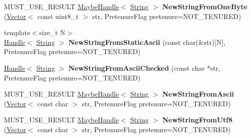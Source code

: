 \begin{DoxyCompactItemize}
\item 
\hypertarget{classv8_1_1internal_1_1_v8___f_i_n_a_l_a5a57b9c1756c5880f2775f196f86bc47}{}M\+U\+S\+T\+\_\+\+U\+S\+E\+\_\+\+R\+E\+S\+U\+L\+T \hyperlink{classv8_1_1internal_1_1_maybe_handle}{Maybe\+Handle}$<$ \hyperlink{classv8_1_1internal_1_1_string}{String} $>$ {\bfseries New\+String\+From\+One\+Byte} (\hyperlink{classv8_1_1internal_1_1_vector}{Vector}$<$ const uint8\+\_\+t $>$ str, Pretenure\+Flag pretenure=N\+O\+T\+\_\+\+T\+E\+N\+U\+R\+E\+D)\label{classv8_1_1internal_1_1_v8___f_i_n_a_l_a5a57b9c1756c5880f2775f196f86bc47}

\item 
\hypertarget{classv8_1_1internal_1_1_v8___f_i_n_a_l_aad865b24215fcfad3f95d02990b3a79b}{}{\footnotesize template$<$size\+\_\+t N$>$ }\\\hyperlink{classv8_1_1internal_1_1_handle}{Handle}$<$ \hyperlink{classv8_1_1internal_1_1_string}{String} $>$ {\bfseries New\+String\+From\+Static\+Ascii} (const char(\&str)\mbox{[}N\mbox{]}, Pretenure\+Flag pretenure=N\+O\+T\+\_\+\+T\+E\+N\+U\+R\+E\+D)\label{classv8_1_1internal_1_1_v8___f_i_n_a_l_aad865b24215fcfad3f95d02990b3a79b}

\item 
\hypertarget{classv8_1_1internal_1_1_v8___f_i_n_a_l_a8e19093b27a9fa79035ae3d762309a9b}{}\hyperlink{classv8_1_1internal_1_1_handle}{Handle}$<$ \hyperlink{classv8_1_1internal_1_1_string}{String} $>$ {\bfseries New\+String\+From\+Ascii\+Checked} (const char $\ast$str, Pretenure\+Flag pretenure=N\+O\+T\+\_\+\+T\+E\+N\+U\+R\+E\+D)\label{classv8_1_1internal_1_1_v8___f_i_n_a_l_a8e19093b27a9fa79035ae3d762309a9b}

\item 
\hypertarget{classv8_1_1internal_1_1_v8___f_i_n_a_l_a0302eca57048bc6517ad9d75ca5e763d}{}M\+U\+S\+T\+\_\+\+U\+S\+E\+\_\+\+R\+E\+S\+U\+L\+T \hyperlink{classv8_1_1internal_1_1_maybe_handle}{Maybe\+Handle}$<$ \hyperlink{classv8_1_1internal_1_1_string}{String} $>$ {\bfseries New\+String\+From\+Ascii} (\hyperlink{classv8_1_1internal_1_1_vector}{Vector}$<$ const char $>$ str, Pretenure\+Flag pretenure=N\+O\+T\+\_\+\+T\+E\+N\+U\+R\+E\+D)\label{classv8_1_1internal_1_1_v8___f_i_n_a_l_a0302eca57048bc6517ad9d75ca5e763d}

\item 
\hypertarget{classv8_1_1internal_1_1_v8___f_i_n_a_l_a5c9d843f1ad34ae6f82df7b72c2fcd4d}{}M\+U\+S\+T\+\_\+\+U\+S\+E\+\_\+\+R\+E\+S\+U\+L\+T \hyperlink{classv8_1_1internal_1_1_maybe_handle}{Maybe\+Handle}$<$ \hyperlink{classv8_1_1internal_1_1_string}{String} $>$ {\bfseries New\+String\+From\+Utf8} (\hyperlink{classv8_1_1internal_1_1_vector}{Vector}$<$ const char $>$ str, Pretenure\+Flag pretenure=N\+O\+T\+\_\+\+T\+E\+N\+U\+R\+E\+D)\label{classv8_1_1internal_1_1_v8___f_i_n_a_l_a5c9d843f1ad34ae6f82df7b72c2fcd4d}


\end{DoxyCompactItemize}
